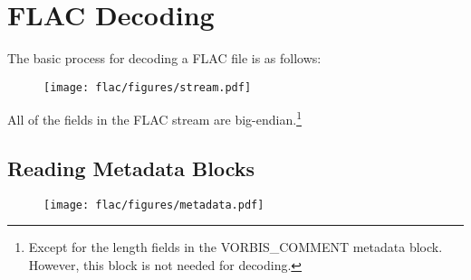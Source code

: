 
\section{FLAC Decoding}

The basic process for decoding a FLAC file is as follows:
\par
\noindent

\begin{figure}[h]
\texttt{[image: flac/figures/stream.pdf]}
\end{figure}
\par
All of the fields in the FLAC stream are big-endian.\footnote{Except
for the length fields in the VORBIS\_COMMENT metadata block.
However, this block is not needed for decoding.
}

\clearpage

\subsection{Reading Metadata Blocks}
\label{flac:read_metadata}
{

}
\begin{figure}[h]
\texttt{[image: flac/figures/metadata.pdf]}
\end{figure}

\clearpage

